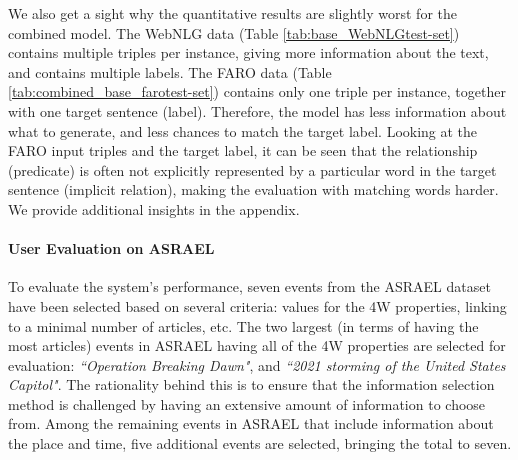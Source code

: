 \documentclass[
]{ceurart}
\begin{document}
We also get a sight why the quantitative results are slightly worst for the combined model. The WebNLG data (Table \ref{tab:base_WebNLGtest-set}) contains multiple triples per instance, giving more information about the text, and contains multiple labels. The FARO data (Table \ref{tab:combined_base_farotest-set}) contains only one triple per instance, together with one target sentence (label). Therefore, the model has less information about what to generate, and less chances to match the target label. Looking at the FARO input triples and the target label, it can be seen that the relationship (predicate) is often not explicitly represented by a particular word in the target sentence (implicit relation), making the evaluation with matching words harder. We provide additional insights in the appendix.

\paragraph*{User Evaluation on ASRAEL}
\label{sec:result_gen_text_nodes}
To evaluate the system's performance, seven events from the ASRAEL dataset have been selected based on several criteria: values for the 4W properties, linking to a minimal number of articles, etc. The two largest (in terms of having the most articles) events in ASRAEL having all of the 4W properties are selected for evaluation: \textit{``Operation Breaking Dawn"}, and \textit{``2021 storming of the United States Capitol"}. The rationality behind this is to ensure that the information selection method is challenged by having an extensive amount of information to choose from. Among the remaining events in ASRAEL that include information about the place and time, five additional events are selected, bringing the total to seven.
\end{document}
